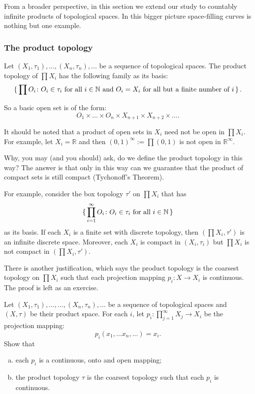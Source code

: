 From a broader perspective,
in this section we extend our study to countably infinite products
of topological spaces.
In this bigger picture space-filling curves is nothing but one example.

\subsubsection{The product topology}

Let $(X_1, \tau_1), \dots, (X_n, \tau_n), ...$ be a sequence of topological spaces.
The product topology of $\prod X_i$ has the following family as its basis:
$$
\set{ \prod O_i \colon O_i \in \tau_i \text{ for all $i \in \mathbb N$ and $O_i = X_i$ for all but a finite number of }i}.
$$

So a basic open set is of the form: 
$$O_1 \times \dots \times O_n \times X_{n+1} \times X_{n+2} \times \dots .$$

It should be noted that a product of open sets in $X_i$ need not be open in $\prod X_i$. 
For example,  let $X_i = \mathbb R$ and then $(0,1)^\infty :=\prod (0,1)$ is not open in $\mathbb R ^\infty$.

Why, you may (and you should) ask, do we define the product topology in this way?
The answer is that only in this way can we guarantee that the product of compact sets is still compact (Tychonoff's Theorem).

For example, consider the box topology $\tau'$ on $\prod X_i$ that has 
$$\set{\prod_{i=1}^\infty  O_i \colon O_i \in \tau_i \text{ for all }i \in \mathbb N} $$
as its basis.
If each $X_i$ is a finite set with discrete topology, 
then $(\prod X_i, \tau')$ is an infinite discrete space. Moreover, each $X_i$ is compact in $(X_i, \tau_i)$ but
$\prod X_i$ is not compact in $(\prod X_i, \tau')$. 
 

There is another justification, which says the product topology is the coarsest
topology on $\prod X_i$ such that each projection mapping
$p_i \colon X \to X_i$ is continuous. 
The proof is left as an exercise.




\begin{qst}
Let $(X_1, \tau_1), \dots,..., (X_n, \tau_n), \dots$ be a sequence of topological spaces and $(X, \tau)$ be their product space. For each $i$, let $p_i \colon \prod_{j=1}^\infty X_j \to X_i$ be the projection mapping:
$$
p_i (x_1,...x_n,...) = x_i.
$$
Show that
\begin{enumerate}[(a)]
  \item each $p_i$ is a continuous, onto and open mapping;
  \item the product topology $\tau$ is the coarsest topology such that each $p_i$ is continuous.
\end{enumerate}
\end{qst}



